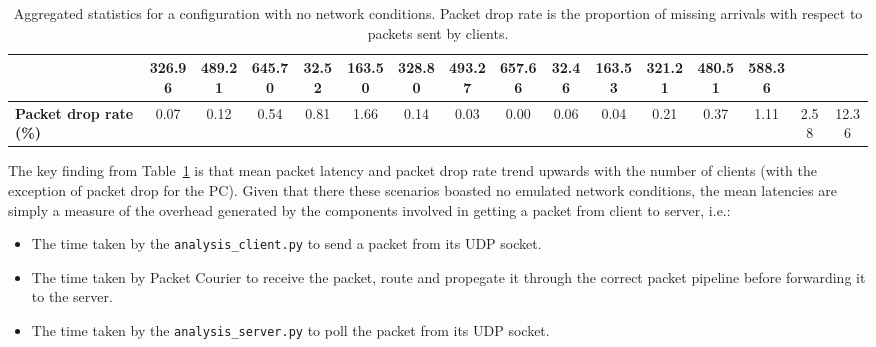 \begin{table}[!h]
{\begin{tabular}{|l|ccccc|ccccc|ccccc|}
            & \multicolumn{1}{c|}{326.96}
            & \multicolumn{1}{c|}{489.21}
            & \multicolumn{1}{c|}{645.70}
            & \multicolumn{1}{c|}{32.52}
            & \multicolumn{1}{c|}{163.50}
            & \multicolumn{1}{c|}{328.80}
            & \multicolumn{1}{c|}{493.27}
            & \multicolumn{1}{c|}{657.66}
            & \multicolumn{1}{c|}{32.46}
            & \multicolumn{1}{c|}{163.53}
            & \multicolumn{1}{c|}{321.21}
            & \multicolumn{1}{c|}{480.51}
            & \multicolumn{1}{c|}{588.36}
            \\ \hline
            \textbf{Packet drop rate (\%)} & \multicolumn{1}{c|}{0.07} & \multicolumn{1}{c|}{0.12}
            & \multicolumn{1}{c|}{0.54}
            & \multicolumn{1}{c|}{0.81}
            & \multicolumn{1}{c|}{1.66}
            & \multicolumn{1}{c|}{0.14}
            & \multicolumn{1}{c|}{0.03}
            & \multicolumn{1}{c|}{0.00}
            & \multicolumn{1}{c|}{0.06}
            & \multicolumn{1}{c|}{0.04}
            & \multicolumn{1}{c|}{0.21}
            & \multicolumn{1}{c|}{0.37}
            & \multicolumn{1}{c|}{1.11}
            & \multicolumn{1}{c|}{2.58}
            & \multicolumn{1}{c|}{12.36}
            \\ \hline
        \end{tabular}
    }
    \caption{Aggregated statistics for a configuration with no network conditions. Packet drop rate is the proportion
    of missing arrivals with respect to packets sent by clients.}
    \label{table:analysis_results_control}
\end{table}

The key finding from Table~\ref{table:analysis_results_control} is that mean packet latency and packet drop rate
trend upwards with the number of clients (with the exception of packet drop for the PC). Given that there these
scenarios boasted no emulated network conditions, the mean latencies are simply a measure of the overhead generated
by the components involved in getting a packet from client to server, i.e.:
\begin{itemize}
    \item The time taken by the \texttt{analysis\_client.py} to send a packet from its UDP socket.
    \item The time taken by Packet Courier to receive the packet, route and propegate it through the correct packet
    pipeline before forwarding it to the server.
    \item The time taken by the \texttt{analysis\_server.py} to poll the packet from its UDP socket.
\end{itemize}

